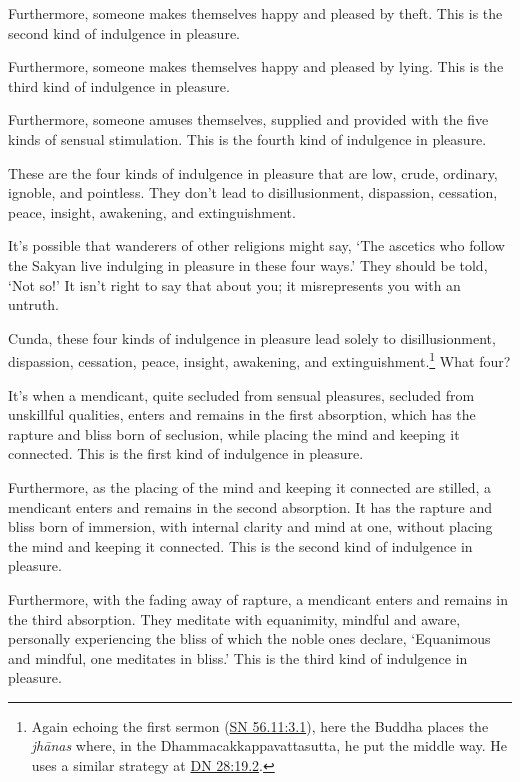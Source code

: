 \documentclass[12pt,openany]{book}%
\begin{document}
Furthermore, someone makes themselves happy and pleased by theft. This is the second kind of indulgence in pleasure. 

Furthermore, someone makes themselves happy and pleased by lying. This is the third kind of indulgence in pleasure. 

Furthermore, someone amuses themselves, supplied and provided with the five kinds of sensual stimulation. This is the fourth kind of indulgence in pleasure. 

These are the four kinds of indulgence in pleasure that are low, crude, ordinary, ignoble, and pointless. They don’t lead to disillusionment, dispassion, cessation, peace, insight, awakening, and extinguishment. 

It’s possible that wanderers of other religions might say, ‘The ascetics who follow the Sakyan live indulging in pleasure in these four ways.’ They should be told, ‘Not so!’ It isn’t right to say that about you; it misrepresents you with an untruth. 

Cunda, these four kinds of indulgence in pleasure lead solely to disillusionment, dispassion, cessation, peace, insight, awakening, and extinguishment.\footnote{Again echoing the first sermon (\href{https://suttacentral.net/sn56.11/en/sujato\#3.1}{SN 56.11:3.1}), here the Buddha places the \textit{\textsanskrit{jhānas}} where, in the Dhammacakkappavattasutta, he put the middle way. He uses a similar strategy at \href{https://suttacentral.net/dn28/en/sujato\#19.2}{DN 28:19.2}. } What four? 

It’s when a mendicant, quite secluded from sensual pleasures, secluded from unskillful qualities, enters and remains in the first absorption, which has the rapture and bliss born of seclusion, while placing the mind and keeping it connected. This is the first kind of indulgence in pleasure. 

Furthermore, as the placing of the mind and keeping it connected are stilled, a mendicant enters and remains in the second absorption. It has the rapture and bliss born of immersion, with internal clarity and mind at one, without placing the mind and keeping it connected. This is the second kind of indulgence in pleasure. 

Furthermore, with the fading away of rapture, a mendicant enters and remains in the third absorption. They meditate with equanimity, mindful and aware, personally experiencing the bliss of which the noble ones declare, ‘Equanimous and mindful, one meditates in bliss.’ This is the third kind of indulgence in pleasure. 
\end{document}
